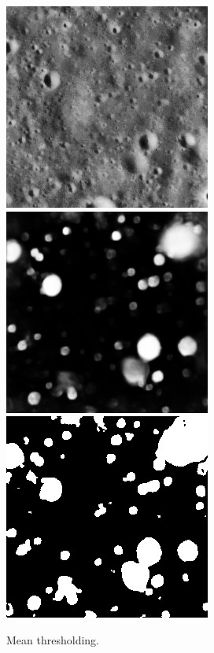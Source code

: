 \documentclass[11pt]{article}
\begin{document}
\begin{figure}[ht!]
	\includegraphics[width=.3\textwidth]{files/results/26.png}\hfill
	\includegraphics[width=.3\textwidth]{files/results/26_predict.png}\hfill
	\includegraphics[width=.3\textwidth]{files/results/mean.png}
	\caption{Mean thresholding.}
	\label{mean_th}
\end{figure}
\end{document}
